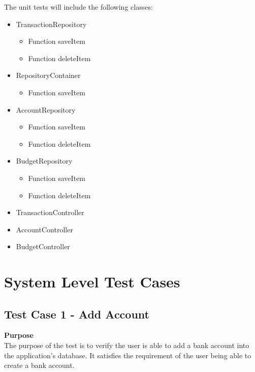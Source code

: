 \documentclass[12pt]{article}
\begin{document}
\setlength{\parskip}{0.8mm}
The unit tests will include the following classes:
\begin {itemize}
	\item TransactionRepository
	\begin {itemize}
		\item Function saveItem
		\item Function deleteItem
	\end {itemize}
	\item RepositoryContainer
	\begin {itemize}
		\item Function saveItem
	\end {itemize}
	\item AccountRepository
	\begin {itemize}
		\item Function saveItem
		\item Function deleteItem
	\end {itemize}
	\item BudgetRepository
	\begin {itemize}
		\item Function saveItem
		\item Function deleteItem
	\end {itemize}
	\item TransactionController
	\item AccountController
	\item BudgetController
\end {itemize}



\clearpage
\section{System Level Test Cases}



\subsection {Test Case 1 - Add Account} \label{TC-1}

\noindent
{\bf Purpose}\\
The purpose of the test is to verify the user is able to add a bank account into the application's database.
It satisfies the requirement of the user being able to create a bank account.\\
\end{document}

